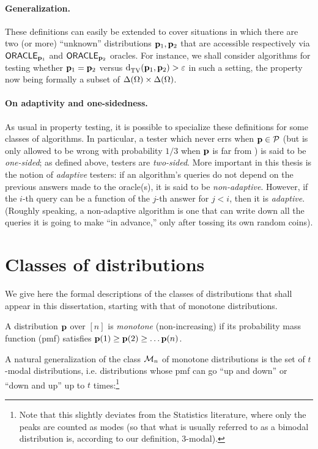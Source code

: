 \paragraph{Generalization.} These definitions can easily be extended to cover situations in which there are two (or more) ``unknown'' distributions $\mathbf{p}_1,\mathbf{p}_2$ that are accessible respectively via ${\sf ORACLE}_{\mathbf{p}_1}$ and ${\sf ORACLE}_{\mathbf{p}_2}$ oracles. For instance, we shall consider algorithms for testing whether $\mathbf{p}_1 = \mathbf{p}_2$ versus  ${\operatorname{d}_{\rm{TV}}^{}\!\left({\mathbf{p}_1, \mathbf{p}_2}\right)} > \varepsilon$ in such a setting, the property now being formally a subset of $\Delta\!\left({\Omega}\right)\times\Delta\!\left({\Omega}\right)$.

\paragraph{On adaptivity and one-sidedness.} As usual in property testing, it is possible to specialize these definitions for some classes of algorithms. In particular, a tester which never errs when $\mathbf{p}\in\mathcal{P}$ (but is only allowed to be wrong with probability $1/3$ when $\mathbf{p}$ is far from \property) is said to be \emph{one-sided}; as defined above, testers are \emph{two-sided}. More important in this thesis is the notion of \emph{adaptive} testers: if an algorithm's queries do not depend on the previous answers made to the oracle(s), it is said to be \emph{non-adaptive}. However, if the $i$-th query can be a function of the $j$-th answer for $j< i$, then it is \emph{adaptive}. (Roughly speaking, a non-adaptive algorithm is one that can write down all the queries it is going to make ``in advance,'' only after tossing its own random coins).

\section{Classes of distributions}\label{ssec:class:definitions}

We give here the formal descriptions of the classes of distributions that shall appear in this dissertation, starting with that of monotone distributions.
\begin{definition}[monotone]\label{def:monotone}
A distribution $\mathbf{p}$ over $[n]$ is \emph{monotone} (non-increasing) if its probability mass function (pmf) satisfies $\mathbf{p}(1) \geq \mathbf{p}(2) \geq \dots \mathbf{p}(n)$.
\end{definition}
 A natural generalization of the class $\mathcal{M}_{n}$ of monotone distributions is the set of $t$-modal distributions, i.e. distributions whose pmf can go ``up and down'' or ``down and up'' up to $t$ times:\footnote{Note that this slightly deviates from the Statistics literature, where only the peaks are counted as modes (so that what is usually referred to as a bimodal distribution is, according to our definition, $3$-modal).}

